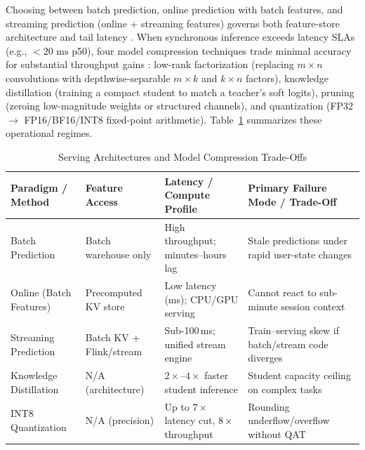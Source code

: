\documentclass[../../../../master.tex]{subfiles}
\begin{document}
Choosing between batch prediction, online prediction with batch features, and streaming prediction (online + streaming features) governs both feature-store architecture and tail latency . When synchronous inference exceeds latency SLAs (e.g., $< 20\text{ ms}$ p50), four model compression techniques trade minimal accuracy for substantial throughput gains : low-rank factorization (replacing $m \times n$ convolutions with depthwise-separable $m \times k$ and $k \times n$ factors), knowledge distillation (training a compact student to match a teacher's soft logits), pruning (zeroing low-magnitude weights or structured channels), and quantization (FP32 $\to$ FP16/BF16/INT8 fixed-point arithmetic). Table~\ref{tab:mlsys:serving_compression} summarizes these operational regimes.

\begin{table}[htbp]
\centering
\caption{Serving Architectures and Model Compression Trade-Offs }
\label{tab:mlsys:serving_compression}
\renewcommand{\arraystretch}{1.2}
\begin{tabularx}{\textwidth}{@{} >{\raggedright\arraybackslash}p{3.2cm} >{\raggedright\arraybackslash}p{3.4cm} >{\raggedright\arraybackslash}p{3.8cm} >{\raggedright\arraybackslash}X @{}}
\toprule
\textbf{Paradigm / Method} & \textbf{Feature Access} & \textbf{Latency / Compute Profile} & \textbf{Primary Failure Mode / Trade-Off} \\
\midrule
Batch Prediction & Batch warehouse only & High throughput; minutes--hours lag & Stale predictions under rapid user-state changes \\
Online (Batch Features) & Precomputed KV store & Low latency (ms); CPU/GPU serving & Cannot react to sub-minute session context \\
Streaming Prediction & Batch KV + Flink/stream & Sub-100\,ms; unified stream engine & Train--serving skew if batch/stream code diverges \\
Knowledge Distillation & N/A (architecture) & $2\times$--$4\times$ faster student inference & Student capacity ceiling on complex tasks \\
INT8 Quantization & N/A (precision) & Up to $7\times$ latency cut, $8\times$ throughput & Rounding underflow/overflow without QAT \\
\bottomrule
\end{tabularx}
\end{table}
\end{document}

